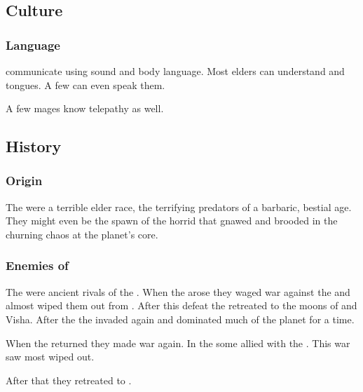 \subsection{Culture}





\subsubsection{Language}
\Vorcanths{} communicate using sound and body language. 
Most elders can understand \draconic{} and \resphan{} tongues. 
A few can even speak them. 

A few mages know telepathy as well. 









\subsection{History}





\subsubsection{Origin}
The \vorcanths were a terrible elder race, the terrifying predators of a barbaric, bestial age. 
They might even be the spawn of the horrid  that gnawed and brooded in the churning chaos at the planet's core. 





\subsubsection{Enemies of \ophidians}
The \vorcanths{} were ancient rivals of the \ophidians. 
When the \dragons arose they waged war against the \vorcanths and almost wiped them out from \Miith. 
After this defeat the \vorcanths retreated to the moons of \Dun and Visha. 
After the \firstbanewar the \vorcanths invaded \Miith again and dominated much of the planet for a time. 

When the \dragons returned they made war again. 
In the \secondbanewar some \vorcanths allied with the \resphain.
This war saw most \vorcanths wiped out. 

After that they retreated to \Dun.





